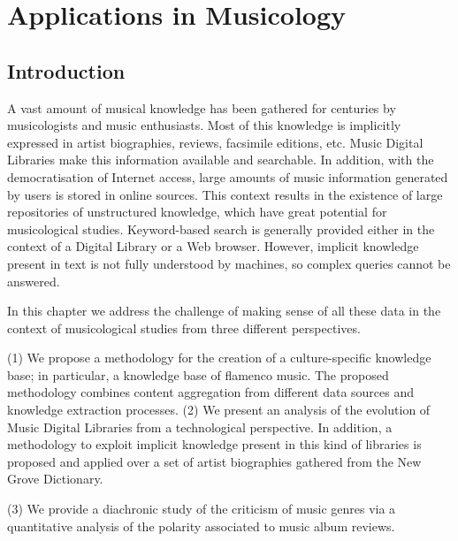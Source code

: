 
\chapter{Applications in Musicology}
\label{sec:musicology:musicology}

\section{Introduction}
\label{sec:musicology:introduction}

A vast amount of musical knowledge has been gathered for centuries by musicologists and music enthusiasts. Most of this knowledge is implicitly expressed in artist biographies, reviews, facsimile editions, etc. Music Digital Libraries make this information available and searchable. 
In addition, with the democratisation of Internet access, large amounts of music information generated by users is stored in online sources. This context results in the existence of large repositories of unstructured knowledge, which have great potential for musicological studies.
Keyword-based search is generally provided either in the context of a Digital Library or a Web browser. However, implicit knowledge present in text is not fully understood by machines, so complex queries cannot be answered. 

In this chapter we address the challenge of making sense of all these data in the context of musicological studies from three different perspectives. 

(1) 
We propose a methodology for the creation of a culture-specific knowledge base; in particular, a knowledge base of flamenco music. The proposed methodology combines content aggregation from different data sources and knowledge extraction processes. %
(2) 
We present an analysis of the evolution of Music Digital Libraries from a technological perspective. In addition, a methodology to exploit implicit knowledge present in this kind of libraries is proposed and applied over a set of artist biographies gathered from the New Grove Dictionary. 

(3)
We provide a diachronic study of the criticism of music genres via a quantitative analysis of the polarity associated to music album reviews. %

